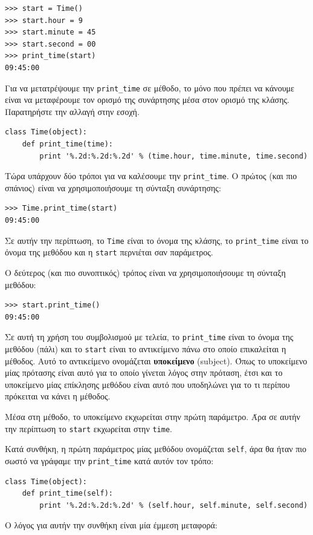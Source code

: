 \documentclass[10pt]{book}
\begin{document}
\begin{verbatim}
>>> start = Time()
>>> start.hour = 9
>>> start.minute = 45
>>> start.second = 00
>>> print_time(start)
09:45:00
\end{verbatim}
%
Για να μετατρέψουμε την \verb"print_time" σε μέθοδο, το μόνο που πρέπει να κάνουμε είναι να μεταφέρουμε
τον ορισμό της συνάρτησης μέσα στον ορισμό της κλάσης. Παρατηρήστε την αλλαγή στην εσοχή. 

\begin{verbatim}
class Time(object):
    def print_time(time):
        print '%.2d:%.2d:%.2d' % (time.hour, time.minute, time.second)
\end{verbatim}
%
Τώρα υπάρχουν δύο τρόποι για να καλέσουμε την \verb"print_time". Ο πρώτος (και πιο σπάνιος) είναι να
χρησιμοποιήσουμε τη σύνταξη συνάρτησης:


\begin{verbatim}
>>> Time.print_time(start)
09:45:00
\end{verbatim}
%
Σε αυτήν την περίπτωση, το {\tt Time} είναι το όνομα της κλάσης, το \verb"print_time"
είναι το όνομα της μεθόδου και η {\tt start} περνιέται σαν παράμετρος.

Ο δεύτερος (και πιο συνοπτικός) τρόπος είναι να χρησιμοποιήσουμε τη σύνταξη μεθόδου:

\begin{verbatim}
>>> start.print_time()
09:45:00
\end{verbatim}
%
Σε αυτή τη χρήση του συμβολισμού με τελεία, το \verb"print_time" είναι το όνομα της μεθόδου (πάλι) και το
{\tt start} είναι το αντικείμενο πάνω στο οποίο επικαλείται η μέθοδος. Αυτό το αντικείμενο ονομάζεται
{\bf υποκείμενο} (subject). Όπως το υποκείμενο μίας πρότασης είναι αυτό για το οποίο γίνεται λόγος στην πρόταση,
έτσι και το υποκείμενο μίας επίκλησης μεθόδου είναι αυτό που υποδηλώνει για το τι περίπου πρόκειται να κάνει η
μέθοδος.

Μέσα στη μέθοδο, το υποκείμενο εκχωρείται στην πρώτη παράμετρο. Άρα σε αυτήν την περίπτωση το {\tt start}
εκχωρείται στην {\tt time}.

Κατά συνθήκη, η πρώτη παράμετρος μίας μεθόδου ονομάζεται {\tt self}, άρα θα ήταν πιο σωστό να γράφαμε την
\verb"print_time" κατά αυτόν τον τρόπο:

\begin{verbatim}
class Time(object):
    def print_time(self):
        print '%.2d:%.2d:%.2d' % (self.hour, self.minute, self.second)
\end{verbatim}
%
Ο λόγος για αυτήν την συνθήκη είναι μία έμμεση μεταφορά:
\end{document}
